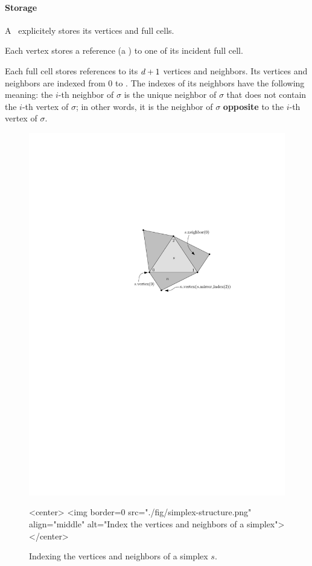 \paragraph{Storage}

A \tds\ explicitely stores its vertices and full cells.

Each vertex stores a reference (a ) to one of its incident
full cell.


Each full cell stores references to its $d+1$ vertices and
neighbors. Its vertices and neighbors are indexed from $0$ to \cd. The indexes
of its neighbors have the following meaning: the $i$-th neighbor of $\sigma$
is the unique neighbor of $\sigma$ that does not contain the $i$-th vertex of
$\sigma$; in other words, it is the neighbor of $\sigma$ \textbf{opposite} to
the $i$-th vertex of $\sigma$.

\begin{figure}[htbp]
\begin{ccTexOnly}
\begin{center}
\includegraphics{Triangulation/fig/simplex-structure.pdf}
\end{center}
\end{ccTexOnly}
\begin{ccHtmlOnly}
<center>
<img border=0 src="./fig/simplex-structure.png" align="middle" alt="Index the vertices and neighbors of a simplex">
</center>
\end{ccHtmlOnly}
\caption{Indexing the vertices and neighbors of a simplex $s$.}
\label{triangulation:fig:simplex}
\end{figure} 

